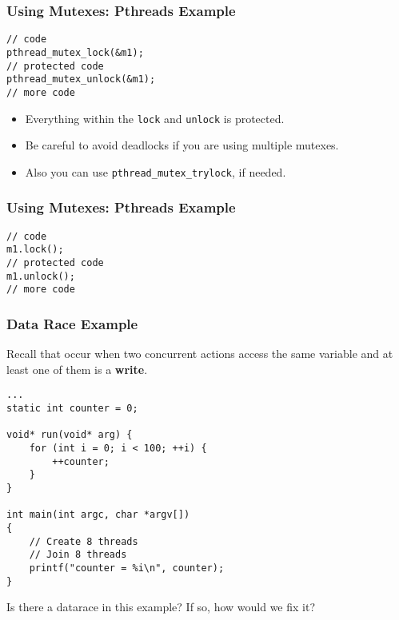 \documentclass[aspectratio=43]{beamer}
\newenvironment{changemargin}[1]{%
  \begin{list}{}{%
    \setlength{\topsep}{0pt}%
    \setlength{\leftmargin}{#1}%
    \setlength{\rightmargin}{1em}
    \setlength{\listparindent}{\parindent}%
    \setlength{\itemindent}{\parindent}%
    \setlength{\parsep}{\parskip}%
  }%
  \item[]}{\end{list}}
\begin{document}
\begin{frame}[fragile]
  \frametitle{Using Mutexes: Pthreads Example}

\begin{changemargin}{1.5cm}
  \begin{lstlisting}
// code
pthread_mutex_lock(&m1);
// protected code
pthread_mutex_unlock(&m1);
// more code
  \end{lstlisting}
  \vfill
  \begin{itemize}
    \item Everything within the {\tt lock} and {\tt unlock} is protected.
    \item Be careful to avoid deadlocks if you are using multiple mutexes.
    \item Also you can use {\tt pthread\_mutex\_trylock}, if needed.
  \end{itemize}
\end{changemargin}
\end{frame}

\begin{frame}[fragile]
  \frametitle{Using Mutexes: Pthreads Example}

\begin{changemargin}{1.5cm}
  \begin{lstlisting}
// code
m1.lock(); 
// protected code
m1.unlock();
// more code
  \end{lstlisting}
\end{changemargin}
\end{frame}

\begin{frame}[fragile]
  \frametitle{Data Race Example}

\begin{changemargin}{1.5cm}
  Recall that  occur when two concurrent actions access the same
  variable and at least one of them is a {\bf write}.


  \begin{lstlisting}
...
static int counter = 0;

void* run(void* arg) {
    for (int i = 0; i < 100; ++i) {
        ++counter;
    }
}

int main(int argc, char *argv[])
{
    // Create 8 threads
    // Join 8 threads
    printf("counter = %i\n", counter);
}
  \end{lstlisting}

Is there a datarace in this example? If so, how would we fix it?
\end{changemargin}

\end{frame}
\end{document}
